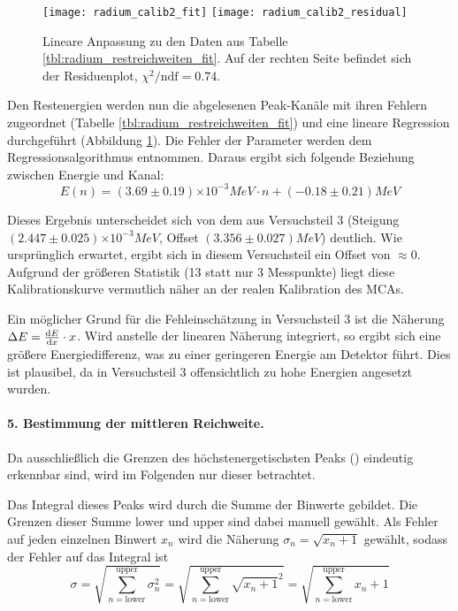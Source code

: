 \documentclass{../Misc/MontavonLaTeX/Montavon}
\newcommand{\e}[1]{\ensuremath{\times 10^{#1}}}
\newcommand{\halfwidth}{0.48\textwidth}
\begin{document}
\begin{figure}[htbp]
\texttt{[image: radium\_calib2\_fit]}
\texttt{[image: radium\_calib2\_residual]}
\caption{Lineare Anpassung zu den Daten aus Tabelle \ref{tbl:radium_restreichweiten_fit}. Auf der rechten Seite befindet sich der Residuenplot, $\chi^2 / \textrm{ndf} = 0.74$.}
\label{fig:radium_restreichweiten_fit}
\end{figure}

Den Restenergien werden nun die abgelesenen Peak-Kanäle mit ihren Fehlern zugeordnet (Tabelle \ref{tbl:radium_restreichweiten_fit}) und eine lineare Regression durchgeführt (Abbildung \ref{fig:radium_restreichweiten_fit}). Die Fehler der Parameter werden dem Regressionsalgorithmus entnommen.
Daraus ergibt sich folgende Beziehung zwischen Energie und Kanal:
\[
	E(n) = (3.69 \pm 0.19) \e{-3} \unit{MeV} \cdot n + (-0.18 \pm 0.21) \unit{MeV}
\]

Dieses Ergebnis unterscheidet sich von dem aus Versuchsteil 3 (Steigung $(2.447 \pm 0.025) \e{-3} \unit{MeV}$, Offset $(3.356 \pm 0.027) \unit{MeV}$) deutlich. Wie ursprünglich erwartet, ergibt sich in diesem Versuchsteil ein Offset von $\approx 0$. Aufgrund der größeren Statistik (13 statt nur 3 Messpunkte) liegt diese Kalibrationskurve vermutlich näher an der realen Kalibration des MCAs.

Ein möglicher Grund für die Fehleinschätzung in Versuchsteil 3 ist die Näherung $\Delta E = \frac{\mathrm d E}{\mathrm d x} \cdot x$. Wird anstelle der linearen Näherung integriert, so ergibt sich eine größere Energiedifferenz, was zu einer geringeren Energie am Detektor führt. Dies ist plausibel, da in Versuchsteil 3 offensichtlich zu hohe Energien angesetzt wurden.

\paragraph{5. Bestimmung der mittleren Reichweite.}
Da ausschließlich die Grenzen des höchstenergetischsten Peaks () eindeutig erkennbar sind, wird im Folgenden nur dieser betrachtet.

Das Integral dieses Peaks wird durch die Summe der Binwerte gebildet. Die Grenzen dieser Summe $\textrm{lower}$ und $\textrm{upper}$ sind dabei manuell gewählt. Als Fehler auf jeden einzelnen Binwert $x_n$ wird die Näherung $\sigma_n = \sqrt{x_n+1}$ gewählt, sodass der Fehler auf das Integral ist
\[
	\sigma = \sqrt{\sum_{n=\textrm{lower}}^\textrm{upper} \sigma_n^2} = \sqrt{\sum_{n=\textrm{lower}}^\textrm{upper} \sqrt{x_n+1}^2} = \sqrt{\sum_{n=\textrm{lower}}^\textrm{upper} x_n+1} 
\]
\end{document}
